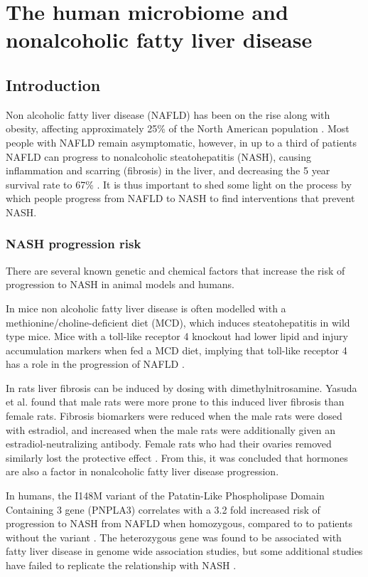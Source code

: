 \chapter{The human microbiome and nonalcoholic fatty liver disease}

\section{Introduction}
Non alcoholic fatty liver disease (NAFLD) has been on the rise along with obesity, affecting approximately 25\% of the North American population \cite{preiss2008non}. Most people with NAFLD remain asymptomatic, however, in up to a third of patients NAFLD can progress to nonalcoholic steatohepatitis (NASH), causing inflammation and scarring (fibrosis) in the liver, and decreasing the 5 year survival rate to 67\% \cite{propst1995prognosis}. It is thus important to shed some light on the process by which people progress from NAFLD to NASH to find interventions that prevent NASH.

\subsection{NASH progression risk}
There are several known genetic and chemical factors that increase the risk of progression to NASH in animal models and humans.

In mice non alcoholic fatty liver disease is often modelled with a methionine/choline-deficient diet (MCD), which induces steatohepatitis in wild type mice. Mice with a toll-like receptor 4 knockout had lower lipid and injury accumulation markers when fed a MCD diet, implying that toll-like receptor 4 has a role in the progression of NAFLD \cite{rivera2007toll}.

In rats liver fibrosis can be induced by dosing with dimethylnitrosamine. Yasuda et al. \cite{yasuda1999suppressive} found that male rats were more prone to this induced liver fibrosis than female rats. Fibrosis biomarkers were reduced when the male rats were dosed with estradiol, and increased when the male rats were additionally given an estradiol-neutralizing antibody. Female rats who had their ovaries removed similarly lost the protective effect \cite{yasuda1999suppressive}. From this, it was concluded that hormones are also a factor in nonalcoholic fatty liver disease progression.

In humans, the I148M variant of the Patatin-Like Phospholipase Domain Containing 3 gene (PNPLA3) correlates with a 3.2 fold increased risk of progression to NASH from NAFLD when homozygous, compared to to patients without the variant \cite{sookoian2011meta}. The heterozygous gene was found to be associated with fatty liver disease in genome wide association studies, but some additional studies have failed to replicate the relationship with NASH \cite{sookoian2011meta}.

